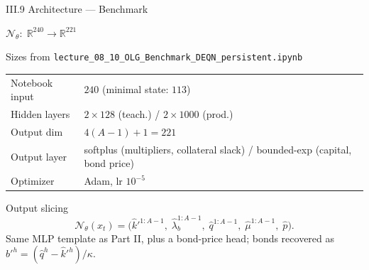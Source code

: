 \documentclass[aspectratio=169,11pt]{beamer}
\newcommand{\R}{\mathbb{R}}
\newcommand{\N}{\mathcal{N}}
\begin{document}
\begin{frame}{III.9 Architecture --- Benchmark}
\scriptsize
\begin{center}
$\N_\theta:\;\R^{240} \to \R^{221}$
\end{center}
\vspace{-4pt}

\begin{block}{Sizes from \texttt{lecture\_08\_10\_OLG\_Benchmark\_DEQN\_persistent.ipynb}}
\centering
\begin{tabular}{ll}
\toprule
Notebook input   & $240$ (minimal state: $113$) \\
Hidden layers    & $2{\times}128$ (teach.) / $2{\times}1000$ (prod.) \\
Output dim       & $4(A{-}1) + 1 = 221$ \\
Output layer     & softplus (multipliers, collateral slack) / bounded-exp (capital, bond price) \\
Optimizer        & Adam, lr $10^{-5}$\\
\bottomrule
\end{tabular}
\end{block}

\vspace{-3pt}
\begin{exampleblock}{Output slicing}
\vspace{-6pt}
\[
\N_\theta(x_t)
=
\bigl(\hat k'^{1:A-1},\;\hat\lambda_b^{1:A-1},\;\hat q^{1:A-1},\;\hat\mu^{1:A-1},\;\hat p\bigr).
\]
\vspace{-4pt}
Same MLP template as Part II, plus a bond-price head; bonds recovered as $\hat b'^h=(\hat q^h-\hat k'^h)/\kappa$.
\end{exampleblock}
\end{frame}
\end{document}
